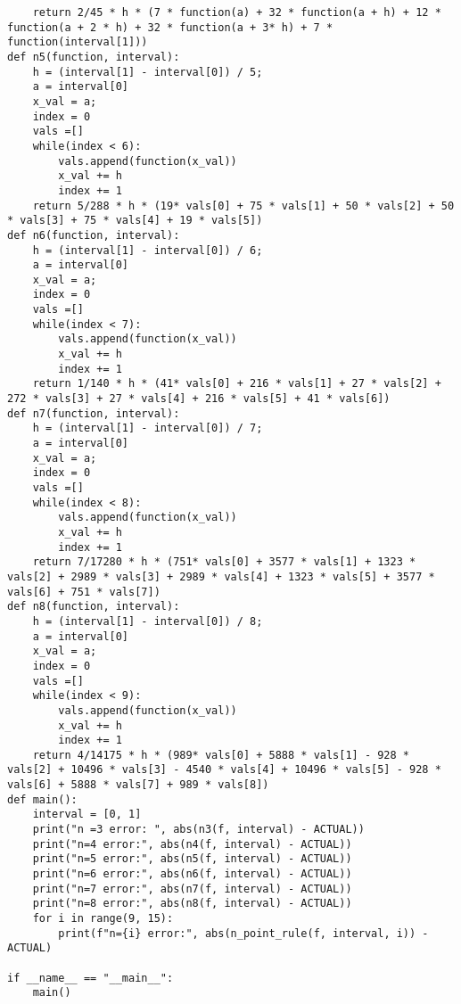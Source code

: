 \documentclass{article}
\begin{document}
\begin{enumerate}
\begin{lstlisting}
    return 2/45 * h * (7 * function(a) + 32 * function(a + h) + 12 * function(a + 2 * h) + 32 * function(a + 3* h) + 7 * function(interval[1])) 
def n5(function, interval):
    h = (interval[1] - interval[0]) / 5;
    a = interval[0]
    x_val = a;
    index = 0
    vals =[]
    while(index < 6):
        vals.append(function(x_val))
        x_val += h
        index += 1
    return 5/288 * h * (19* vals[0] + 75 * vals[1] + 50 * vals[2] + 50 * vals[3] + 75 * vals[4] + 19 * vals[5])
def n6(function, interval):
    h = (interval[1] - interval[0]) / 6;
    a = interval[0]
    x_val = a;
    index = 0
    vals =[]
    while(index < 7):
        vals.append(function(x_val))
        x_val += h
        index += 1
    return 1/140 * h * (41* vals[0] + 216 * vals[1] + 27 * vals[2] + 272 * vals[3] + 27 * vals[4] + 216 * vals[5] + 41 * vals[6])
def n7(function, interval):
    h = (interval[1] - interval[0]) / 7;
    a = interval[0]
    x_val = a;
    index = 0
    vals =[]
    while(index < 8):
        vals.append(function(x_val))
        x_val += h
        index += 1
    return 7/17280 * h * (751* vals[0] + 3577 * vals[1] + 1323 * vals[2] + 2989 * vals[3] + 2989 * vals[4] + 1323 * vals[5] + 3577 * vals[6] + 751 * vals[7])
def n8(function, interval):
    h = (interval[1] - interval[0]) / 8;
    a = interval[0]
    x_val = a;
    index = 0
    vals =[]
    while(index < 9):
        vals.append(function(x_val))
        x_val += h
        index += 1
    return 4/14175 * h * (989* vals[0] + 5888 * vals[1] - 928 * vals[2] + 10496 * vals[3] - 4540 * vals[4] + 10496 * vals[5] - 928 * vals[6] + 5888 * vals[7] + 989 * vals[8])
def main():
    interval = [0, 1]
    print("n =3 error: ", abs(n3(f, interval) - ACTUAL))
    print("n=4 error:", abs(n4(f, interval) - ACTUAL))
    print("n=5 error:", abs(n5(f, interval) - ACTUAL))
    print("n=6 error:", abs(n6(f, interval) - ACTUAL))
    print("n=7 error:", abs(n7(f, interval) - ACTUAL))
    print("n=8 error:", abs(n8(f, interval) - ACTUAL))
    for i in range(9, 15):
        print(f"n={i} error:", abs(n_point_rule(f, interval, i)) - ACTUAL)
    
if __name__ == "__main__":
    main()
\end{lstlisting}
\end{enumerate}
\end{document}
